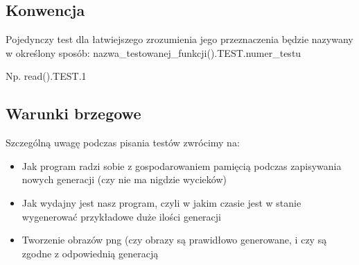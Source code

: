 \documentclass[12pt,a4paper,notitlepage]{report}
\begin{document}
\subsection{Konwencja}
Pojedynczy test dla łatwiejszego zrozumienia jego przeznaczenia będzie nazywany w określony sposób:
nazwa\_testowanej\_funkcji().TEST.numer\_testu

Np. read().TEST.1

\subsection{Warunki brzegowe}
Szczególną uwagę podczas pisania testów zwrócimy na:
\begin{itemize}
	\item Jak program radzi sobie z gospodarowaniem pamięcią podczas zapisywania nowych generacji (czy nie ma nigdzie wycieków)
	\item Jak wydajny jest nasz program, czyli w jakim czasie jest w stanie wygenerować przykładowe duże ilości generacji
	\item Tworzenie obrazów png (czy obrazy są prawidłowo generowane, i czy są zgodne z odpowiednią generacją
	
\end{itemize}
\end{document}
